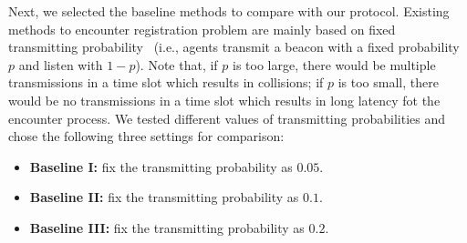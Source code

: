 \begin{table}[htbp]
	\caption{Parameter Settings}
	\label{para}
	\centering
\end{table}

Next, we selected the baseline methods to compare with our protocol. 
Existing methods to encounter registration problem are mainly based on fixed transmitting 
probability~\cite{Menhill2012NovelTelemetry,Rutz2012AutomatedMapping}
(i.e., agents transmit a beacon with a fixed probability $p$ and listen with $1-p$).  
Note that, if $p$ is too large, there would be multiple transmissions in a time slot which results in 
collisions; if $p$ is too small, there would be no transmissions in a time slot which results 
in long latency fot the encounter process.
We tested different values of transmitting probabilities and chose the following three settings for comparison: 
\begin{itemize}
    \item \textbf{Baseline I:} fix the transmitting probability as $0.05$. 
    \item \textbf{Baseline II:} fix the transmitting probability as $0.1$. 
    \item \textbf{Baseline III:} fix the transmitting probability as $0.2$. 
\end{itemize}


